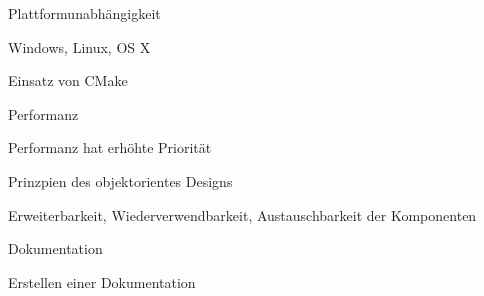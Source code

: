 \begin{compactenum}[a)]
	\item Plattformunabhängigkeit
		\begin{compactenum}[1.]
			\item Windows, Linux, OS X
			\item Einsatz von CMake
		\end{compactenum}
		\item Performanz
		\begin{compactenum}[1.]
			\item Performanz hat erhöhte Priorität
		\end{compactenum}
		\item Prinzpien des objektorientes Designs
		\begin{compactenum}[1.]
			\item Erweiterbarkeit, Wiederverwendbarkeit, Austauschbarkeit der Komponenten
		\end{compactenum}
		\item Dokumentation
		\begin{compactenum}[1.]
			\item Erstellen einer Dokumentation
		\end{compactenum}
\end{compactenum}

